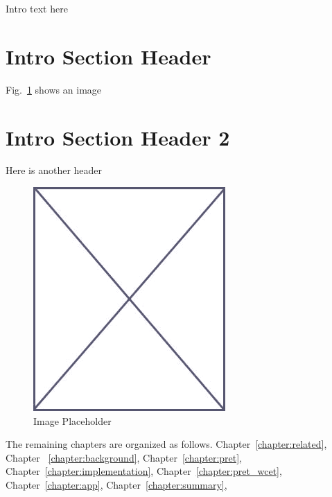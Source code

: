 Intro text here

\section{Intro Section Header}
\label{sec:intro_sec_1}

Fig.~\ref{fig:placeholder_intro} shows an image

\section{Intro Section Header 2}
\label{sec:intro_sec_2}

Here is another header


\begin{figure}
\begin{center}
\vspace{-32pt}
\includegraphics[scale=.45]{figs/placeholder}
\end{center}
\vspace{-12pt}
\caption{Image Placeholder}
\label{fig:placeholder_intro}
\end{figure}

The remaining chapters are organized as follows. 
Chapter~\ref{chapter:related}, 
Chapter ~\ref{chapter:background}, 
Chapter~\ref{chapter:pret}, 
Chapter~\ref{chapter:implementation}, 
Chapter~\ref{chapter:pret_wcet},
Chapter~\ref{chapter:app},
Chapter~\ref{chapter:summary},


